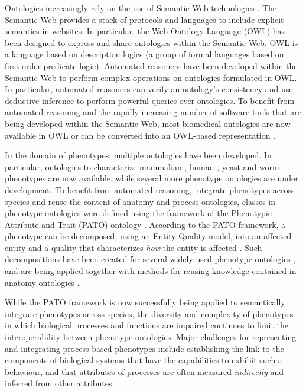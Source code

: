 \documentclass{bioinfo}
\renewcommand{\cite}{\citep}
\begin{document}
Ontologies increasingly rely on the use of Semantic Web technologies
\cite{Berners-Lee2001}. The Semantic Web provides a stack of protocols
and languages to include explicit semantics in websites. In
particular, the Web Ontology Language (OWL) \cite{Grau2008} has been
designed to express and share ontologies within the Semantic Web. OWL
is a language based on description logics (a group of formal languages
based on first-order predicate logic). Automated reasoners have been
developed within the Semantic Web to perform complex operations on
ontologies formulated in OWL. In particular, automated reasoners can
verify an ontology's consistency and use deductive inference to
perform powerful queries over ontologies. To benefit from automated
reasoning and the rapidly increasing number of software tools that are
being developed within the Semantic Web, most biomedical ontologies
are now available in OWL or can be converted into an OWL-based
representation \cite{Horrocks2007, Hoehndorf2010patterns}.

In the domain of phenotypes, multiple ontologies have been
developed. In particular, ontologies to characterize mammalian
\cite{Smith2004}, human \cite{Robinson2008}, yeast \cite{ypo} and worm
\cite{wpo} phenotypes are now available, while several more phenotype
ontologies are under development. To benefit from automated reasoning,
integrate phenotypes across species and reuse the content of anatomy
and process ontologies, classes in phenotype ontologies were defined
using the framework of the Phenotypic Attribute and Trait (PATO)
ontology \cite{Gkoutos2005}. According to the PATO framework, a
phenotype can be decomposed, using an Entity-Quality model, into an
affected entity and a quality that characterizes {\em how} the entity
is affected \cite{Gkoutos2005}. Such decompositions have been created
for several widely used phenotype ontologies \cite{Mungall2010,
  Gkoutos2009b, obml2011h1}, and are being applied together with
methods for reusing knowledge contained in anatomy ontologies
\cite{Mungall2010, Hoehndorf2010phene}.

While the PATO framework is now successfully being applied to
semantically integrate phenotypes across species, the diversity and
complexity of phenotypes in which biological processes and functions
are impaired continues to limit the interoperability between phenotype
ontologies. Major challenges for representing and integrating
process-based phenotypes include establishing the link to the
components of biological systems that have the capabilities to exhibit
such a behaviour, and that attributes of processes are often measured
{\em indirectly} and inferred from other attributes.
\end{document}
